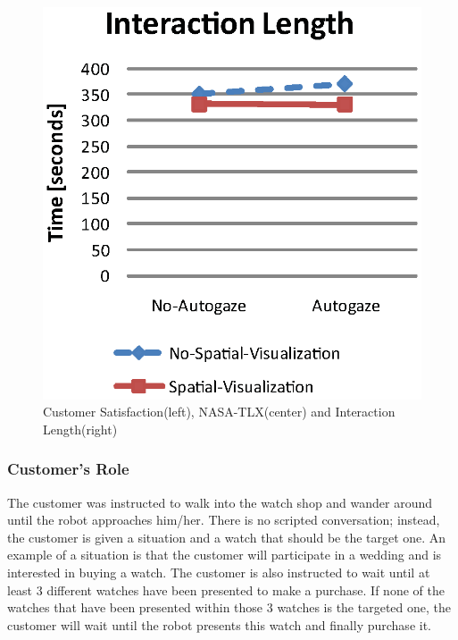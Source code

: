 \documentclass[a4paper, 10pt, conference]{ieeeconf}     %
\begin{document}
\begin{figure}[t]
		\includegraphics[keepaspectratio, scale=0.5]{figs/interactionLengthFinal}
		\caption{Customer Satisfaction(left), NASA-TLX(center) and Interaction Length(right) }
	\label{fig:results}
\end{figure}

\subsubsection{Customer's Role}
The customer was instructed to walk into the watch shop and wander around until the robot approaches him/her. 
There is no scripted conversation; instead, the customer is given a situation and a watch that should be the target one. 
An example of a situation is that the customer will participate in a wedding and is interested in buying a watch. 
The customer is also instructed to wait until at least 3 different watches have been presented to make a purchase. 
If none of the watches that have been presented within those 3 watches is the targeted one, the customer will wait until the robot presents this watch and finally purchase it.
\end{document}
